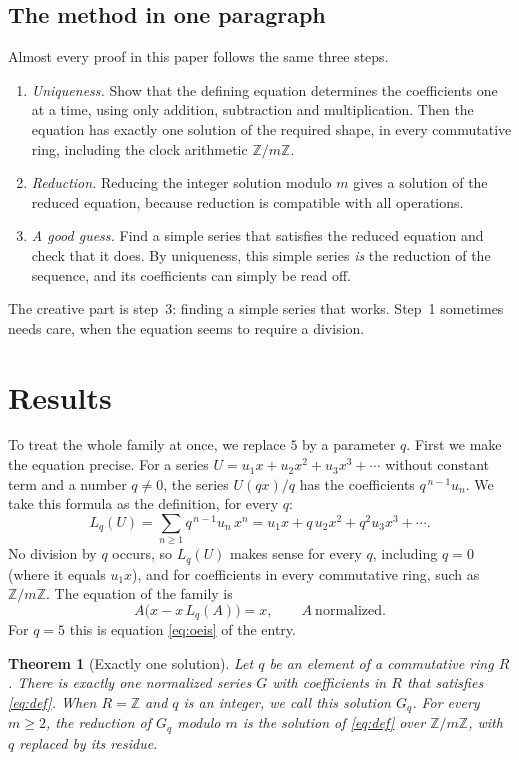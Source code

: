 \documentclass[11pt,a4paper]{article}
\newtheorem{theorem}{Theorem}[section]
\theoremstyle{definition}
\theoremstyle{remark}
\newcommand{\Z}{\mathbb{Z}}
\begin{document}
\subsection{The method in one paragraph}
Almost every proof in this paper follows the same three steps.
\begin{enumerate}
\item \emph{Uniqueness.} Show that the defining equation determines the coefficients one at a time, using only
addition, subtraction and multiplication. Then the equation has exactly one solution of the required shape, in every
commutative ring, including the clock arithmetic $\Z/m\Z$.
\item \emph{Reduction.} Reducing the integer solution modulo $m$ gives a solution of the reduced equation,
because reduction is compatible with all operations.
\item \emph{A good guess.} Find a simple series that satisfies the reduced equation and check that it does. By uniqueness,
this simple series \emph{is} the reduction of the sequence, and its coefficients can simply be read off.
\end{enumerate}
The creative part is step~3: finding a simple series that works. Step~1 sometimes needs care, when the equation seems to
require a division.

\section{Results}\label{sec:results}

To treat the whole family at once, we replace $5$ by a parameter $q$. First we make the equation
precise. For a series $U=u_1x+u_2x^2+u_3x^3+\cdots$ without constant term and a number $q\ne0$, the series $U(qx)/q$
has the coefficients $q^{\,n-1}u_n$. We take this formula as the definition, for every $q$:
\begin{equation}\label{eq:L}
L_q(U)=\sum_{n\ge1}q^{\,n-1}u_n\,x^n=u_1x+q\,u_2x^2+q^2u_3x^3+\cdots .
\end{equation}
No division by $q$ occurs, so $L_q(U)$ makes sense for every $q$, including $q=0$ (where it equals $u_1x$), and for
coefficients in every commutative ring, such as $\Z/m\Z$. The equation of the family is
\begin{equation}\label{eq:def}
A\bigl(x-x\,L_q(A)\bigr)=x,\qquad A\ \text{normalized}.
\end{equation}
For $q=5$ this is equation \eqref{eq:oeis} of the entry.

\begin{theorem}[Exactly one solution]\label{thm:exist}
Let $q$ be an element of a commutative ring $R$. There is exactly one normalized series $G$ with coefficients in $R$
that satisfies \eqref{eq:def}. When $R=\Z$ and $q$ is an integer, we call this solution $G_q$. For every $m\ge2$, the
reduction of $G_q$ modulo $m$ is the solution of \eqref{eq:def} over $\Z/m\Z$, with $q$ replaced by its residue.
\end{theorem}
\end{document}
